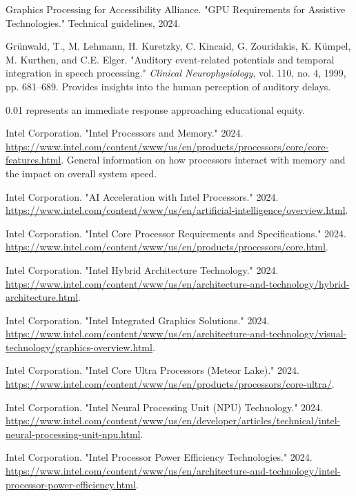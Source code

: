 \begin{thebibliography}{99}
Graphics Processing for Accessibility Alliance. "GPU Requirements for Assistive Technologies." Technical guidelines, 2024.

Grünwald, T., M. Lehmann, H. Kuretzky, C. Kincaid, G. Zouridakis, K. Kümpel, M. Kurthen, and C.E. Elger. "Auditory event-related potentials and temporal integration in speech processing." \emph{Clinical Neurophysiology}, vol. 110, no. 4, 1999, pp. 681--689. Provides insights into the human perception of auditory delays.

0.01 represents an immediate response approaching educational equity.

Intel Corporation. "Intel Processors and Memory." 2024. \url{https://www.intel.com/content/www/us/en/products/processors/core/core-features.html}. General information on how processors interact with memory and the impact on overall system speed.

Intel Corporation. "AI Acceleration with Intel Processors." 2024. \url{https://www.intel.com/content/www/us/en/artificial-intelligence/overview.html}.

Intel Corporation. "Intel Core Processor Requirements and Specifications." 2024. \url{https://www.intel.com/content/www/us/en/products/processors/core.html}.

Intel Corporation. "Intel Hybrid Architecture Technology." 2024. \url{https://www.intel.com/content/www/us/en/architecture-and-technology/hybrid-architecture.html}.

Intel Corporation. "Intel Integrated Graphics Solutions." 2024. \url{https://www.intel.com/content/www/us/en/architecture-and-technology/visual-technology/graphics-overview.html}.

Intel Corporation. "Intel Core Ultra Processors (Meteor Lake)." 2024. \url{https://www.intel.com/content/www/us/en/products/processors/core-ultra/}.

Intel Corporation. "Intel Neural Processing Unit (NPU) Technology." 2024. \url{https://www.intel.com/content/www/us/en/developer/articles/technical/intel-neural-processing-unit-npu.html}.

Intel Corporation. "Intel Processor Power Efficiency Technologies." 2024. \url{https://www.intel.com/content/www/us/en/architecture-and-technology/intel-processor-power-efficiency.html}.


\end{thebibliography}
